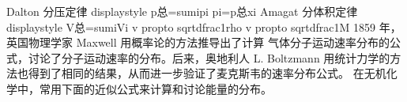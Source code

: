 {}
\markdownRendererSectionEnd 
\markdownRendererSectionEnd \markdownRendererSectionBegin
{}\markdownRendererInterblockSeparator
{}Dalton 分压定律 \markdownRendererDollarSign{}\markdownRendererBackslash{}displaystyle p\markdownRendererUnderscore{}总=\markdownRendererBackslash{}sum\markdownRendererUnderscore{}ip\markdownRendererUnderscore{}i\markdownRendererDollarSign{}\markdownRendererSoftLineBreak
{}\markdownRendererDollarSign{}p\markdownRendererUnderscore{}i=p\markdownRendererUnderscore{}总x\markdownRendererUnderscore{}i\markdownRendererDollarSign{}\markdownRendererParagraphSeparator
{}Amagat 分体积定律 \markdownRendererDollarSign{}\markdownRendererBackslash{}displaystyle V\markdownRendererUnderscore{}总=\markdownRendererBackslash{}sum\markdownRendererUnderscore{}iV\markdownRendererUnderscore{}i\markdownRendererDollarSign{}\markdownRendererInterblockSeparator
{}
\markdownRendererSectionEnd \markdownRendererSectionBegin
{}\markdownRendererInterblockSeparator
{}\markdownRendererDollarSign{}v \markdownRendererBackslash{}propto \markdownRendererBackslash{}sqrt\markdownRendererLeftBrace{}\markdownRendererBackslash{}dfrac\markdownRendererLeftBrace{}1\markdownRendererRightBrace{}\markdownRendererLeftBrace{}\markdownRendererBackslash{}rho\markdownRendererRightBrace{}\markdownRendererRightBrace{}\markdownRendererDollarSign{}\markdownRendererSoftLineBreak
{}\markdownRendererDollarSign{}v \markdownRendererBackslash{}propto \markdownRendererBackslash{}sqrt\markdownRendererLeftBrace{}\markdownRendererBackslash{}dfrac\markdownRendererLeftBrace{}1\markdownRendererRightBrace{}\markdownRendererLeftBrace{}M\markdownRendererRightBrace{}\markdownRendererRightBrace{}\markdownRendererDollarSign{}\markdownRendererInterblockSeparator
{}
\markdownRendererSectionEnd \markdownRendererSectionBegin
{}\markdownRendererInterblockSeparator
{}\markdownRendererSectionBegin
{}\markdownRendererInterblockSeparator
{}1859 年，英国物理学家 Maxwell 用概率论的方法推导出了计算 气体分子运动速率分布的公式，讨论了分子运动速率的分布。后来，奥地利人 L. Boltzmann 用统计力学的方法也得到了相同的结果，从而进一步验证了麦克斯韦的速率分布公式。\markdownRendererInterblockSeparator
{}
\markdownRendererSectionEnd \markdownRendererSectionBegin
{}\markdownRendererInterblockSeparator
{}在无机化学中，常用下面的近似公式来计算和讨论能量的分布。\markdownRendererParagraphSeparator
{}\markdownRendererDollarSign{}\markdownRendererDollarSign{}\markdownRendererSoftLineBreak
